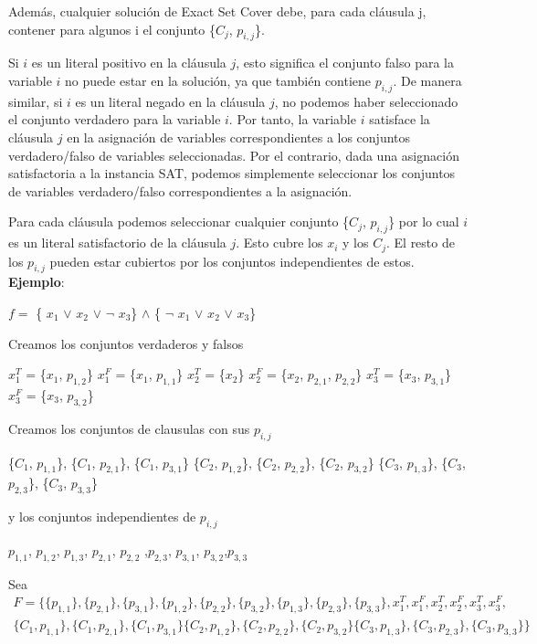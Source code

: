 \documentclass{article}
\begin{document}
Además, cualquier solución de Exact Set Cover debe, para cada cláusula j, contener para algunos i el conjunto \{$C_j$, $p_{i,j}$\}.

Si \(i\) es un literal positivo en la cláusula \(j\), esto significa el conjunto falso para la variable \(i\) no puede estar en la solución, ya que también contiene $p_{i,j}$. De manera similar, si \(i\) es un literal negado en la cláusula \(j\), no podemos haber seleccionado el conjunto verdadero para la variable \(i\). Por tanto, la variable \(i\) satisface la cláusula \(j\) en la asignación de variables correspondientes a los conjuntos verdadero/falso de variables seleccionadas.
Por el contrario, dada una asignación satisfactoria a la instancia SAT, podemos simplemente seleccionar los conjuntos de variables verdadero/falso correspondientes a la asignación.

Para cada cláusula podemos seleccionar cualquier conjunto \{$C_j$, $p_{i,j}$\} por lo cual \(i\) es un literal satisfactorio de la cláusula \(j\). Esto cubre los $x_i$ y los $C_j$. El resto de los $p_{i,j}$ pueden estar cubiertos por los conjuntos independientes de estos.\\

\textbf{Ejemplo}:

$f = $   \{ $x_{1}$ $\vee$ $x_{2}$ $\vee$ $\neg$ $x_{3}$\} $\wedge$ \{ $\neg$ $x_{1}$ $\vee$ $x_{2}$ $\vee$ $x_{3}$\}

Creamos los conjuntos verdaderos y falsos

$x_{1}^{T}$ = \{$x_1$, $p_{1,2}$\}
$x_{1}^{F}$ = \{$x_1$, $p_{1,1}$\}
$x_{2}^{T}$ = \{$x_2$\}
$x_{2}^{F}$ = \{$x_2$, $p_{2,1}$, $p_{2,2}$\}
$x_{3}^{T}$ = \{$x_3$, $p_{3,1}$\}
$x_{3}^{F}$ = \{$x_3$, $p_{3,2}$\}

Creamos los conjuntos de clausulas con sus $p_{i,j}$

\{$C_1$, $p_{1,1}$\}, \{$C_1$, $p_{2,1}$\}, \{$C_1$, $p_{3,1}$\}
\{$C_2$, $p_{1,2}$\}, \{$C_2$, $p_{2,2}$\}, \{$C_2$, $p_{3,2}$\}
\{$C_3$, $p_{1,3}$\}, \{$C_3$, $p_{2,3}$\}, \{$C_3$, $p_{3,3}$\}

y los conjuntos independientes de $p_{i,j}$

$p_{1,1}$, $p_{1,2}$, $p_{1,3}$, $p_{2,1}$, $p_{2,2}$ ,$p_{2,3}$, $p_{3,1}$, $p_{3,2}$,$p_{3,3}$

Sea
\begin{multline}
    F = \{ \{p_{1,1}\}, \{p_{2,1}\},\{p_{3,1}\},\{p_{1,2}\},\{p_{2,2}\},
    \{p_{3,2}\},\{p_{1,3}\}, \{p_{2,3}\},\{p_{3,3}\}, x_{1}^{T},
    x_{1}^{F}, x_{2}^{T}, x_{2}^{F}, x_{3}^{T}, x_{3}^{F},\\
    \{C_1, p_{1,1}\}, \{C_1, p_{2,1}\}, \{C_1, p_{3,1}\}
    \{C_2, p_{1,2}\}, \{C_2, p_{2,2}\}, \{C_2, p_{3,2}\} \{C_3, p_{1,3}\},
    \{C_3, p_{2,3}\}, \{C_3, p_{3,3}\}\}\
\end{multline}
\end{document}
